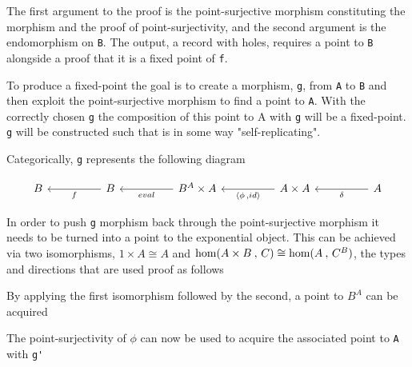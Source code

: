 \begin{AgdaMultiCode}
\end{AgdaMultiCode}

The first argument to the proof is the point-surjective morphism constituting
the morphism and the proof of point-surjectivity, and the second argument is the
endomorphism on \verb|B|. The output, a record with holes, requires a point to
\verb|B| alongside a proof that it is a fixed point of \verb|f|.

To produce a fixed-point the goal is to create a morphism, \verb|g|,  from \verb|A| to
\verb|B| and then exploit the point-surjective morphism to find a point to
\verb|A|. With the correctly chosen \verb|g| the composition of this point to A
with \verb|g| will be a fixed-point. \verb|g| will be constructed such that is
in some way "self-replicating".


Categorically, \verb|g| represents the following diagram

\[\begin{tikzcd}[sep=huge]
    B & B \arrow[l, "f"] & B^A \times A \arrow[l, "eval"] & A \times A \arrow[l,
    "{\langle \phi \, , id\rangle}"] & A \arrow[l, "\delta"]
\end{tikzcd}\]

In order to push \verb|g| morphism back through the point-surjective morphism
it needs to be turned into a point to the exponential object. This can be
achieved via two isomorphisms, $1 \times A \cong A$ and $\textnormal{hom}(A \times B \: , \, C)
\cong \textnormal{hom}(A \: , \, C^B)$, the types and directions that are used proof as
follows

\begin{AgdaMultiCode}
\end{AgdaMultiCode}

By applying the first isomorphism followed by the second, a point to $B^A$ can
be acquired
\begin{AgdaAlign}

The point-surjectivity of $\phi$ can now be used to acquire the associated point
to \verb|A| with \verb|g'|

\end{AgdaAlign}

